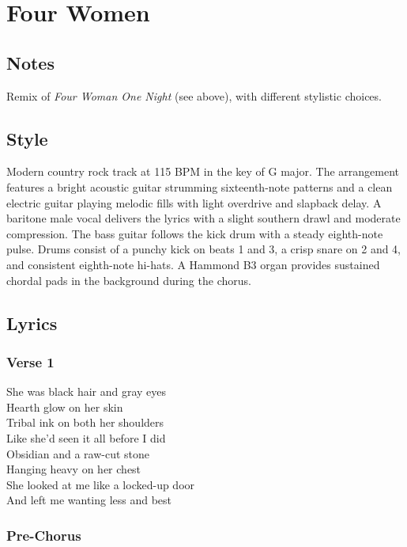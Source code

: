 \section{Four Women}\label{four-women}

\subsection{Notes}\label{notes-17}

Remix of \emph{Four Woman One Night} (see above), with different
stylistic choices.

\subsection{Style}\label{style-17}

Modern country rock track at 115 BPM in the key of G major. The
arrangement features a bright acoustic guitar strumming sixteenth-note
patterns and a clean electric guitar playing melodic fills with light
overdrive and slapback delay. A baritone male vocal delivers the lyrics
with a slight southern drawl and moderate compression. The bass guitar
follows the kick drum with a steady eighth-note pulse. Drums consist of
a punchy kick on beats 1 and 3, a crisp snare on 2 and 4, and consistent
eighth-note hi-hats. A Hammond B3 organ provides sustained chordal pads
in the background during the chorus.

\subsection{Lyrics}\label{lyrics-17}

\subsubsection{Verse 1}\label{verse-1-13}

She was black hair and gray eyes\\
Hearth glow on her skin\\
Tribal ink on both her shoulders\\
Like she'd seen it all before I did\\
Obsidian and a raw-cut stone\\
Hanging heavy on her chest\\
She looked at me like a locked-up door\\
And left me wanting less and best

\subsubsection{Pre-Chorus}\label{pre-chorus-16}

